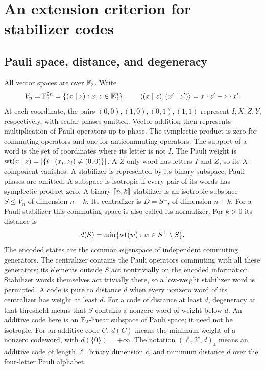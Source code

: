 \section{An extension criterion for stabilizer codes}\label{sec:extension}

\subsection{Pauli space, distance, and degeneracy}

All vector spaces are over \(\mathbb F_2\). Write
\[
 V_n=\mathbb F_2^{2n}=\{(x\mid z):x,z\in\mathbb F_2^n\},\qquad
 \langle(x\mid z),(x'\mid z')\rangle=x\cdot z'+z\cdot x'.
\]
At each coordinate, the pairs \((0,0),(1,0),(0,1),(1,1)\) represent
\(I,X,Z,Y\), respectively, with scalar phases omitted. Vector addition
then represents multiplication of Pauli operators up to phase. The
symplectic product is zero for commuting operators and one for
anticommuting operators. The support of a word is the set of coordinates
where its letter is not \(I\).
The Pauli weight is \(\operatorname{wt}(x\mid z)=|\{i:(x_i,z_i)\ne(0,0)\}|\).
A \(Z\)-only word has letters \(I\) and \(Z\), so its \(X\)-component vanishes.
A stabilizer is represented by its binary subspace; Pauli phases are omitted.
A subspace is isotropic if every pair of its words has symplectic product zero.
A binary \([\![n,k]\!]\) stabilizer is an isotropic subspace
\(S\leq V_n\) of dimension \(n-k\). Its centralizer is \(D=S^\perp\),
of dimension \(n+k\). For a Pauli stabilizer this commuting space is
also called its normalizer. For \(k>0\) its distance is
\[
 d(S)=\min\{\operatorname{wt}(w):w\in S^\perp\setminus S\}.
\]
The encoded states are the common eigenspace of independent commuting
generators. The centralizer contains the Pauli operators commuting with
all these generators; its elements outside \(S\) act nontrivially on
the encoded information. Stabilizer words themselves act trivially there,
so a low-weight stabilizer word is permitted. A code is pure to distance
\(d\) when every nonzero word of its centralizer has weight at least \(d\).
For a code of distance at least \(d\), degeneracy at that threshold
means that \(S\) contains a nonzero word of weight below \(d\).
An additive code here is an \(\mathbb F_2\)-linear subspace of Pauli space;
it need not be isotropic. For an additive code \(C\), \(d(C)\) means the
minimum weight of a nonzero codeword, with \(d(\{0\})=+\infty\).
The notation \((\ell,2^c,d)_4\) means an additive code of length
\(\ell\), binary dimension \(c\), and minimum distance \(d\) over
the four-letter Pauli alphabet.

